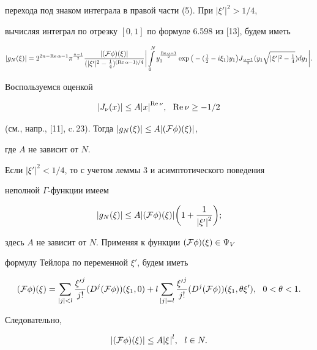 \begin{pf}
перехода под знаком интеграла в правой части (5). При $|\xi'|^2>1/4$,


вычисляя интеграл по отрезку $[0,1]$ по формуле 6.598 из [13], будем иметь


$$


|g_N(\xi)|=2^{2n-\R\alpha-1}{\pi}^{\frac{n-1}{2}}\frac{|(\F\phi)(\xi)|}


{(|\xi'|^2-\frac14)^{(\R\alpha-1)/4}}\bigg|\int\limits_0^N


y_1^{\frac{\R\alpha-1}{2}}\exp\big(-(\tfrac12-i{\xi}_1)y_1\big)




J_{\frac{\alpha-1}{2}}(y_1\sqrt{|\xi'|^2-\tfrac14})dy_1\bigg|.


$$


Воспользуемся оценкой


$$


|J_{\nu}(x)|\leq A{|x|}^{\R\nu},\ \ \R\nu\geq -1/2


$$


(см., напр., [11], c.\,23). Тогда $|g_N(\xi)|\leq A|({\cal F}\phi)(\xi)|$,


где $A$ не зависит от $N$.





Если $|\xi'|^2<1/4$, то с учетом леммы 3 и асимптотического поведения


неполной $\Gamma$-функции имеем


\begin{equation}


|g_N(\xi)|\leq A|(\F\phi)(\xi)|\bigg(1+\frac{1}{{|\xi'|}^2}\bigg);


\end{equation}


здесь $A$ не зависит от $N$. Применяя к функции $({\cal F}\phi)(\xi)\in{\Psi}_V$


формулу Тейлора по переменной $\xi'$, будем иметь


$$


(\F\phi)(\xi) = \sum\limits_{|j|<l}\frac{{\xi'}^j}{j!}(D^j(\F\phi))


(\xi_1,0)+l\sum\limits_{|j|=l}\frac{{\xi'}^j}{j!}(D^j(\F\phi))({\xi}_1,


\theta\xi'),\ \ 0<\theta<1.


$$


Следовательно,


\begin{equation}


|(\F\phi)(\xi)|\leq A{|\xi^{}|}^l,\ \ l\in N.



\end{equation}
\end{pf}
